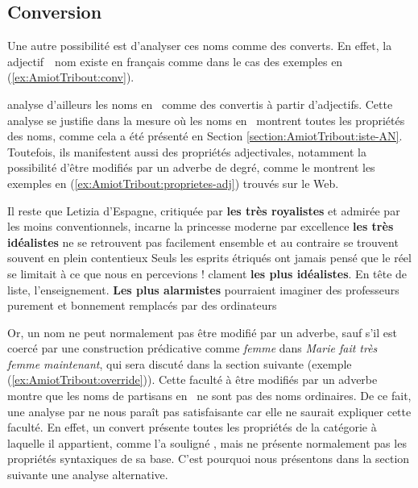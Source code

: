 \documentclass[output=paper]{LSP/langsci}
\begin{document}
\subsection{Conversion}
Une autre possibilité est d'analyser  ces noms comme des converts. En effet, la   adjectif~\orientd~nom existe en français \citep{Corbin87, kerleroux96} comme dans le cas des exemples en (\ref{ex:AmiotTribout:conv}).
\begin{exe}
\ex \label{ex:AmiotTribout:conv} 
\end{exe}

\cite{corbin88} analyse d'ailleurs les noms en \iste\ comme des convertis à partir d'adjectifs. Cette analyse se justifie dans la mesure où les noms en \iste\ montrent toutes les propriétés des noms, comme cela a été présenté en Section \ref{section:AmiotTribout:iste-AN}. Toutefois, ils manifestent aussi des propriétés adjectivales, notamment la possibilité d'être modifiés par un adverbe de degré, comme le montrent les exemples en (\ref{ex:AmiotTribout:proprietes-adj}) trouvés sur le Web.

\begin{exe}
\ex \label{ex:AmiotTribout:proprietes-adj}
\begin{xlist}
\ex Il reste que Letizia d'Espagne, critiquée par \textbf{les très royalistes} et admirée par les moins conventionnels, incarne la princesse moderne par excellence
\ex \textbf{les très idéalistes} ne se retrouvent pas facilement ensemble et au contraire se trouvent souvent en plein contentieux
\ex Seuls les esprits étriqués ont jamais pensé que le réel se limitait à ce que nous en percevions ! clament \textbf{les plus idéalistes}.
\ex En tête de liste, l'enseignement. \textbf{Les plus alarmistes} pourraient imaginer des professeurs purement et bonnement remplacés par des ordinateurs
\end{xlist}
\end{exe}


Or, un nom ne peut normalement pas être modifié par un adverbe, sauf s'il est coercé par une construction prédicative \citep{Lauwers14} comme \textit{femme} dans \textit{Marie fait très femme maintenant}, qui sera discuté dans la section suivante (exemple (\ref{ex:AmiotTribout:override})).
Cette faculté à être modifiés par un adverbe montre que les noms de partisans en \iste\ ne sont pas des noms ordinaires. De ce fait, une analyse par   ne nous paraît pas satisfaisante car elle ne saurait expliquer cette faculté. En effet, un convert présente toutes les propriétés de la catégorie à laquelle il appartient, comme l'a souligné \cite{kerleroux96}, mais ne présente normalement pas les propriétés syntaxiques de sa base. C'est pourquoi nous présentons dans la section suivante une analyse alternative. 
\end{document}
